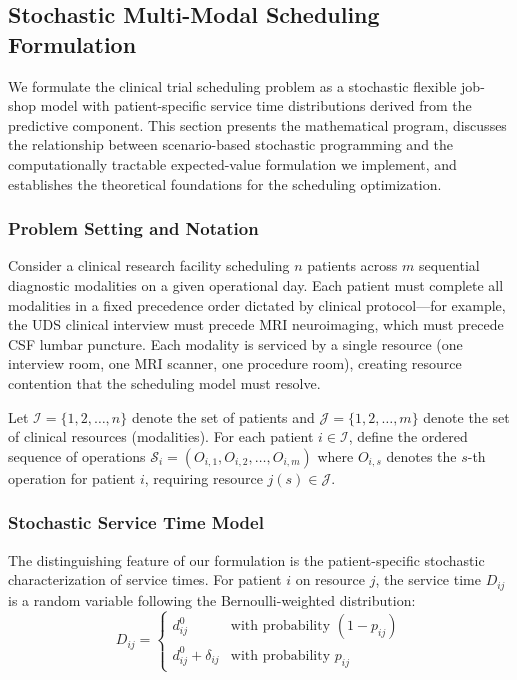 
\subsection{Stochastic Multi-Modal Scheduling Formulation}
\label{sec:scheduling_formulation}

We formulate the clinical trial scheduling problem as a stochastic flexible job-shop model with patient-specific service time distributions derived from the predictive component. This section presents the mathematical program, discusses the relationship between scenario-based stochastic programming and the computationally tractable expected-value formulation we implement, and establishes the theoretical foundations for the scheduling optimization.

\subsubsection{Problem Setting and Notation}

Consider a clinical research facility scheduling $n$ patients across $m$ sequential diagnostic modalities on a given operational day. Each patient must complete all modalities in a fixed precedence order dictated by clinical protocol---for example, the UDS clinical interview must precede MRI neuroimaging, which must precede CSF lumbar puncture. Each modality is serviced by a single resource (one interview room, one MRI scanner, one procedure room), creating resource contention that the scheduling model must resolve.

Let $\mathcal{I} = \{1, 2, \ldots, n\}$ denote the set of patients and $\mathcal{J} = \{1, 2, \ldots, m\}$ denote the set of clinical resources (modalities). For each patient $i \in \mathcal{I}$, define the ordered sequence of operations $\mathcal{S}_i = (O_{i,1}, O_{i,2}, \ldots, O_{i,m})$ where $O_{i,s}$ denotes the $s$-th operation for patient $i$, requiring resource $j(s) \in \mathcal{J}$.

\subsubsection{Stochastic Service Time Model}

The distinguishing feature of our formulation is the patient-specific stochastic characterization of service times. For patient $i$ on resource $j$, the service time $D_{ij}$ is a random variable following the Bernoulli-weighted distribution:
\begin{equation}
D_{ij} = 
\begin{cases}
d_{ij}^0 & \text{with probability } (1 - p_{ij}) \\
d_{ij}^0 + \delta_{ij} & \text{with probability } p_{ij}
\end{cases}
\label{eq:service_time_rv}
\end{equation}


